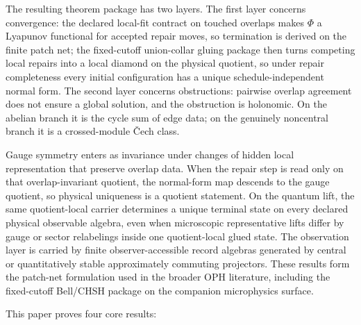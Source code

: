 \documentclass[11pt]{article}
\theoremstyle{remark}
\theoremstyle{plain}
\begin{document}
The resulting theorem package has two layers. The first layer concerns convergence: the declared
local-fit contract on touched overlaps makes \(\Phi\) a Lyapunov functional for accepted repair
moves, so termination is derived on the finite patch net; the fixed-cutoff union-collar gluing
package then turns competing local repairs into a local diamond on the physical quotient, so
under repair completeness every initial configuration has a unique schedule-independent normal
form. The second layer concerns obstructions: pairwise overlap agreement does not ensure a
global solution, and the obstruction is holonomic. On the abelian branch it is the cycle sum of
edge data; on the genuinely noncentral branch it is a crossed-module \v{C}ech class.

Gauge symmetry enters as invariance under changes of hidden local representation that preserve
overlap data. When the repair step is read only on that overlap-invariant quotient, the
normal-form map descends to the gauge quotient, so physical uniqueness is a quotient statement.
On the quantum lift, the same quotient-local carrier determines a unique terminal state on every
declared physical observable algebra, even when microscopic representative lifts differ by gauge
or sector relabelings inside one quotient-local glued state.
The observation layer is carried by finite observer-accessible record algebras generated by
central or quantitatively stable approximately commuting projectors. These results form the
patch-net formulation used in the broader OPH literature, including the fixed-cutoff Bell/CHSH
package on the companion microphysics surface.

This paper proves four core results:
\end{document}
